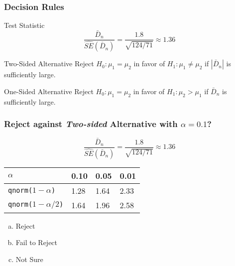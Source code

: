 \documentclass{beamer}
\begin{document}
\begin{frame}
\frametitle{Decision Rules}
\small
{}
\vspace{0.1em}


\begin{block}
	{Test Statistic}
$$\displaystyle \frac{\bar{D}_n}{\widehat{SE}(\bar{D}_n)}=\frac{1.8}{\sqrt{124/71}} \approx 1.36$$
\end{block}


\begin{block}{Two-Sided Alternative} 
Reject $H_0\colon \mu_1 = \mu_2$ in favor of $H_1\colon \mu_1 \neq \mu_2$ if $|\bar{D}_n|$ is sufficiently large.
\end{block}
\begin{block}{One-Sided Alternative}
Reject $H_0\colon \mu_1 = \mu_2$ in favor of $H_1\colon \mu_2 >\mu_1$ if $\bar{D}_n$ is sufficiently large.
\end{block}
\end{frame}

\begin{frame}
\frametitle{Reject against \emph{Two-sided} Alternative with $\alpha = 0.1$?  }

	$$\boxed{\displaystyle \frac{\bar{D}_n}{\widehat{SE}(\bar{D}_n)}= \frac{1.8}{\sqrt{124/71}} \approx 1.36} $$

\begin{center}
\begin{tabular}{l|lll}
$\alpha$ &   0.10& 0.05 &0.01\\
\hline
\texttt{qnorm($1-\alpha$)} & 1.28 &1.64 &2.33\\
\texttt{qnorm($1-\alpha/2$)} &1.64 &1.96& 2.58
\end{tabular}
\end{center}

\begin{enumerate}[(a)]
\item Reject
\item Fail to Reject
\item Not Sure
\end{enumerate}

\end{frame}
\end{document}
